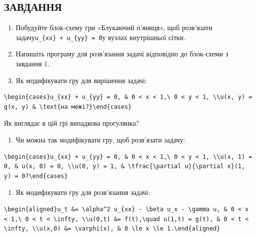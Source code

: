 \documentclass[
  ukrainian,
]{article}
\providecommand{\tightlist}{%
  \setlength{\itemsep}{0pt}\setlength{\parskip}{0pt}}
\begin{document}
\subsection{ЗАВДАННЯ}\label{ux437ux430ux432ux434ux430ux43dux43dux44f-7}

\begin{enumerate}
\def\labelenumi{\arabic{enumi}.}
\item
  Побудуйте блок-схему гри «Блукаючий п'яниця», щоб розв'язати
  задачу\texttt{u\_\{xx\}\ +\ u\_\{yy\}\ =\ 0}у вузлах внутрішньої
  сітки.
\item
  Напишіть програму для розв'язання задачі відповідно до блок-схеми з
  завдання 1.
\item
  Як модифікувати гру для вирішення задачі:
\end{enumerate}

\begin{verbatim}
\begin{cases}u_{xx} + u_{yy} = 0, & 0 < x < 1,\ 0 < y < 1, \\u(x, y) = g(x, y) & \text{на межі?}\end{cases}
\end{verbatim}

Як виглядає в цій грі випадкова прогулянка?

\begin{enumerate}
\def\labelenumi{\arabic{enumi}.}
\setcounter{enumi}{3}
\tightlist
\item
  Чи можна так модифікувати гру, щоб розв'язати задачу:
\end{enumerate}

\begin{verbatim}
\begin{cases}u_{xx} + u_{yy} = 0, & 0 < x < 1,\ 0 < y < 1, \\u(x, 1) = 0, & u(x, 0) = 0, \\u(0, y) = 1, & \tfrac{\partial u}{\partial x}(1, y) = 0?\end{cases}
\end{verbatim}

\begin{enumerate}
\def\labelenumi{\arabic{enumi}.}
\setcounter{enumi}{4}
\tightlist
\item
  Як модифікувати гру для розв'язання задачі:
\end{enumerate}

\begin{verbatim}
\begin{aligned}u_t &= \alpha^2 u_{xx} - \beta u_x - \gamma u, & 0 < x < 1,\ 0 < t < \infty, \\u(0,t) &= f(t),\quad u(1,t) = g(t), & 0 < t < \infty, \\u(x,0) &= \varphi(x), & 0 \le x \le 1.\end{aligned}
\end{verbatim}
\end{document}
